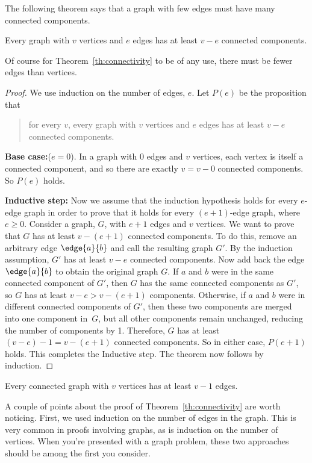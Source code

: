The following theorem says that a graph with few edges must have many
connected components.
\begin{theorem}\label{th:connectivity}
Every graph with $v$ vertices and $e$ edges has at least $v - e$ connected
components.
\end{theorem}
Of course for Theorem~\ref{th:connectivity} to be of any use, there must
be fewer edges than vertices.

\begin{proof}
We use induction on the number of edges, $e$.  Let $P(e)$ be the
proposition that
\begin{quote}
for every $v$, every graph with $v$ vertices and $e$ edges has at least
$v-e$ connected components.
\end{quote}

\textbf{Base case:}($e=0$).  In a graph with 0 edges and $v$ vertices,
each vertex is itself a connected component, and so there are exactly $v =
v - 0$ connected components.  So $P(e)$ holds.

\textbf{Inductive step:} Now we assume that the induction hypothesis
holds for every $e$-edge graph in order to prove that it holds for
every $(e+1)$-edge graph, where $e \geq 0$.  Consider a graph, $G$,
with $e + 1$ edges and $v$ vertices.  We want to prove that $G$ has at
least $v - (e+1)$ connected components.  To do this, remove an
arbitrary edge $\edge{a}{b}$ and call the resulting graph $G'$.  By
the induction assumption, $G'$ has at least $v - e$ connected
components.  Now add back the edge $\edge{a}{b}$ to obtain the
original graph $G$.  If $a$ and $b$ were in the same connected
component of $G'$, then $G$ has the same connected components as $G'$,
so $G$ has at least $v -e > v - (e+1)$ components.  Otherwise, if $a$
and $b$ were in different connected components of $G'$, then these two
components are merged into one component in~$G$, but all other
components remain unchanged, reducing the number of components by 1.
Therefore, $G$ has at least $(v - e) - 1 = v - (e+1)$ connected
components.  So in either case, $P(e+1)$ holds.  This completes the
Inductive step.  The theorem now follows by induction.
\end{proof}

\begin{corollary}
\label{cor:n-1}
Every connected graph with $v$ vertices has at least $v - 1$ edges.
\end{corollary}

A couple of points about the proof of Theorem~\ref{th:connectivity}
are worth noticing.  First, we used induction on the number of edges
in the graph.  This is very common in proofs involving graphs, as is
induction on the number of vertices.  When you're presented with a
graph problem, these two approaches should be among the first you
consider.

